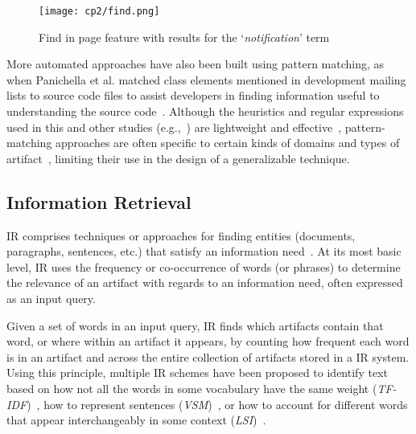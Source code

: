 \medskip
\begin{figure}[h!]
    \centering
    \texttt{[image: cp2/find.png]}
    \caption{Find in page feature with results for the `\textit{notification}' term}
    \label{fig:find-in-page}
\end{figure}


More automated approaches have also been built using pattern matching, 
as when Panichella et al. 
matched class elements mentioned in development mailing 
 lists to source code files
to assist developers in finding information useful to 
 understanding the source code~\cite{panichella2012}.
Although the heuristics and regular expressions used in this and other studies (e.g.,~\cite{nadi2020, Maalej2013})
are lightweight and effective~\cite{Bavota2016}, 
pattern-matching approaches 
are often specific to certain kinds of domains and types of artifact~\cite{fucci2019}, 
limiting their use in the design of a generalizable technique.






\subsection{Information Retrieval }
\label{cp2:information-retrieval}


\acf{IR} comprises techniques
or approaches for finding entities (documents, paragraphs, sentences, etc.)
that satisfy an information need~\cite{manning2010IR}.
At its most basic level, 
\acs{IR}
uses the 
frequency or co-occurrence of words (or phrases) to determine the relevance
of an artifact with regards to an information need, often expressed as an input query.



Given a set of words in an input query,
\acs{IR} finds which artifacts contain that word, or where within an artifact it appears,
by counting how frequent each word is in 
an artifact and across the entire collection of artifacts stored in a \acs{IR} system.
Using this principle, multiple \acs{IR} schemes have been proposed 
to identify text based on 
how not all the words in some vocabulary have the same weight (\textit{TF-IDF})~\cite{luhn1957tf, jones2004idf}, 
how to  represent sentences (\textit{VSM})~\cite{Salton1975vsm}, 
or how to account for different words that appear interchangeably in some context (\textit{LSI})~\cite{dumais1994latent}.




